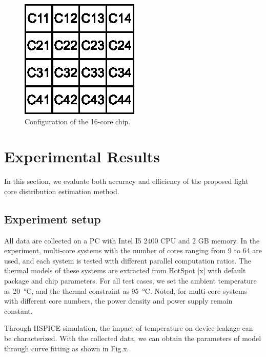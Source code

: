 
\begin{figure}
\centering
\includegraphics[width=0.5\linewidth]{fig/core_distribution.eps}
\caption{Configuration of the 16-core chip.}
\end{figure}

\section{Experimental Results}

In this section, we evaluate both accuracy and efficiency of the proposed light core distribution estimation method. 

\subsection{Experiment setup}
All data are collected on a PC with Intel I5 2400 CPU and 2 GB memory. In the experiment, multi-core systems with the number of cores ranging from 9 to 64 are used, and each system is tested with different parallel computation ratios. The thermal models of these systems are extracted from HotSpot [x] with default package and chip parameters. For all test cases, we set the ambient temperature as \SI{20}{\degreeCelsius}, and the thermal constraint as \SI{95}{\degreeCelsius}. Noted, for multi-core systems with different core numbers, the power density and power supply remain constant.

Through HSPICE simulation, the impact of temperature on device leakage can be characterized. With the collected data, we can obtain the parameters of model through curve fitting as shown in Fig.x.

